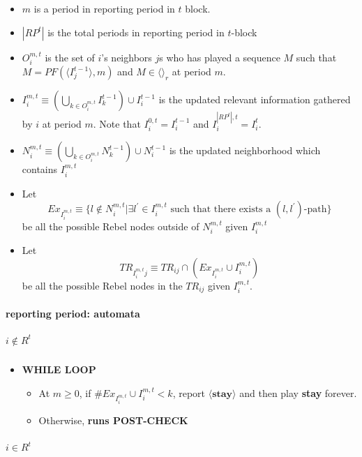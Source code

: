 \documentclass[12pt,letter]{article}
\theoremstyle{definition}
\theoremstyle{remark}
\theoremstyle{claim}
\begin{document}
\begin{itemize}
\item $m$ is a period in reporting period in $t$ block.
\item $| RP^t |$ is the total periods in reporting period in $t$-block
\item $O^{m,t}_i$ is the set of $i$'s neighbors $j$s who has played a sequence $M$ such that $M=PF(\langle I^{t-1}_j \rangle,m)$ and $M \in \langle \rangle_r$ at period $m$. 
\item $I^{m,t}_i\equiv (\bigcup_{k\in O^{m,t}_i} I^{t-1}_k)\cup I^{t-1}_i$ is the updated relevant information gathered by $i$ at period $m$. Note that $I^{0,t}_i=I^{t-1}_i$ and $I^{| RP^t|,t }_i=I^{t}_i$.
\item $N^{m,t}_i\equiv (\bigcup_{k\in O^{m,t}_i} N^{t-1}_k)\cup N^{t-1}_i$
is the updated neighborhood which contains $I^{m,t}_i$

\item Let 
\[Ex_{I^{m,t}_i}\equiv \{l\notin N^{m,t}_i|\exists l^{'}\in I^{m,t}_i\text{ such that there exists a $(l,l^{'})$-path}\}\]
be all the possible Rebel nodes outside of $N^{m,t}_i$ given $I^{m,t}_i$
\item Let
\[TR_{I^{m,t}_ij}\equiv TR_{ij}\cap (Ex_{I^{m,t}_i}\cup I^{m,t}_i)\]
be all the possible Rebel nodes in the $TR_{ij}$ given $I^{m,t}_i$. 
\end{itemize}
\paragraph{reporting period: automata}
\subparagraph{$i\notin R^{t}$}




\begin{itemize}
\item \textbf{WHILE LOOP}
\begin{itemize}
\item At $m\geq 0$, if $\#Ex_{I^{m,t}_i}\cup I^{m,t}_i< k$, report $\langle \textbf{stay} \rangle$ and then play \textbf{stay} forever.
\item Otherwise, \textbf{runs POST-CHECK }
\end{itemize}
\end{itemize}

\subparagraph{$i\in R^{t}$}
\end{document}
